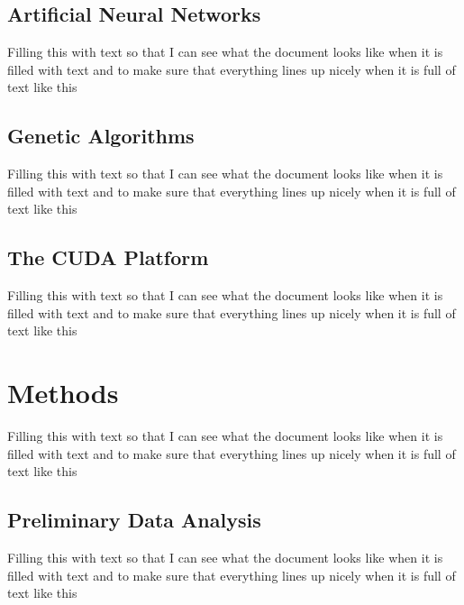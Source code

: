 \documentclass[11pt]{article}       %
\begin{document}
\subsection{Artificial Neural Networks} \label{ann}
Filling this with text so that I can see what the document looks like when it is filled with text and to make sure that everything lines up nicely when it is full of text like this

\subsection{Genetic Algorithms} \label{ga}
Filling this with text so that I can see what the document looks like when it is filled with text and to make sure that everything lines up nicely when it is full of text like this

\subsection{The CUDA Platform} \label{cuda}
Filling this with text so that I can see what the document looks like when it is filled with text and to make sure that everything lines up nicely when it is full of text like this

\section{Methods} \label{algimp}
Filling this with text so that I can see what the document looks like when it is filled with text and to make sure that everything lines up nicely when it is full of text like this

\subsection{Preliminary Data Analysis} \label{prelim}
Filling this with text so that I can see what the document looks like when it is filled with text and to make sure that everything lines up nicely when it is full of text like this
\end{document}
